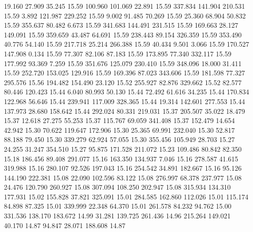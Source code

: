   19.160   27.909   35.245        15.59
 100.960  101.069   22.891        15.59
 337.834  141.904  210.531        15.59
   3.892  121.987  229.252        15.59
   9.002   91.485   70.269        15.59
  25.360   68.904   50.832        15.59
 355.637   80.482    6.673        15.59
 341.683  144.491  231.515        15.59
 169.663   28.127  149.091        15.59
 359.659   43.487   64.691        15.59
 238.443   89.154  326.359        15.59
 353.490   40.776   54.140        15.59
 217.718   25.214  266.388        15.59
  40.434    9.501    3.066        15.59
 170.527  147.908    0.134        15.59
  77.307   82.106   87.183        15.59
 173.895   77.340  332.117        15.59
 177.992   93.369    7.259        15.59
 351.676  125.079  230.410        15.59
 348.096   18.000   31.411        15.59
 252.720  153.025  129.916        15.59
 169.396   87.023  343.606        15.59
 181.598   77.327  295.576        15.56
 194.482  154.490   23.120        15.52
 255.927   82.876  329.662        15.52
  82.577   80.446  120.423        15.44
   6.040   80.993   50.130        15.44
  72.492   61.616   34.235        15.44
 170.834  122.968   56.646        15.44
 239.941  117.009  328.365        15.44
  19.314  142.601  277.553        15.44
 137.973   28.680  158.642        15.44
 292.024   80.331  219.031        15.37
 205.507   35.022   18.479        15.37
  12.618   27.275   55.253        15.37
 115.767   69.059  341.408        15.37
 152.479   14.654   42.942        15.30
  70.622  119.647  172.906        15.30
  25.365   69.991  232.040        15.30
  52.817   88.188   79.450        15.30
 339.279   62.924   57.055        15.30
 355.456  105.949   28.703        15.27
  24.255   31.247  354.510        15.27
  95.875  171.528  211.072        15.23
 109.486   80.842   82.350        15.18
 186.456   89.408  291.077        15.16
 163.350  134.937    7.046        15.16
 278.587   41.615  319.988        15.16
 280.107   92.526  197.043        15.16
 254.542   34.891  182.667        15.16
  95.126  144.190  222.381        15.08
  22.090  102.596   83.122        15.08
 276.997   68.378  237.977        15.08
  24.476  120.790  260.927        15.08
 307.094  108.250  202.947        15.08
 315.934  134.310  177.931        15.02
 155.828   37.821  325.091        15.01
 284.585  162.860  112.026        15.01
 115.174   84.898   87.325        15.01
 339.999   22.348   64.370        15.01
 261.578   84.232   94.762        15.00
 331.536  138.170  183.672        14.99
  31.281  139.725  261.436        14.96
 215.264  149.021   40.170        14.87
  94.847   28.071  188.608        14.87
